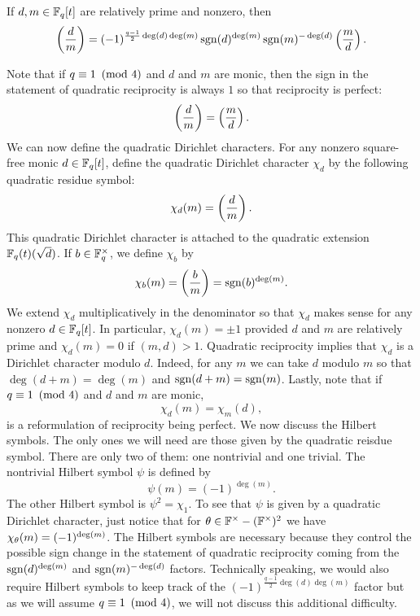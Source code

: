         \begin{theorem}
            If $d,m \in \mathbb{F}_{q}[t]$ are relatively prime and nonzero, then
            \[
                \left(\frac{d}{m}\right) = (-1)^{\frac{q-1}{2}\deg(d)\deg(m)}\operatorname{\mathrm{sgn}}(d)^{\deg(m)}\operatorname{\mathrm{sgn}}(m)^{-\deg(d)}\left(\frac{m}{d}\right).
            \]
        \end{theorem}

        Note that if $q \equiv 1 \ \left(\text{mod }4\right)$ and $d$ and $m$ are monic, then the sign in the statement of quadratic reciprocity is always $1$ so that reciprocity is perfect:
        \[
            \left(\frac{d}{m}\right) = \left(\frac{m}{d}\right).
        \]
        We can now define the quadratic Dirichlet characters. For any nonzero square-free monic $d \in \mathbb{F}_{q}[t]$, define the quadratic Dirichlet character $\chi_{d}$ by the following quadratic residue symbol:
        \[
            \chi_{d}(m) = \left(\frac{d}{m}\right).
        \]
        This quadratic Dirichlet character is attached to the quadratic extension $\mathbb{F}_{q}(t)(\sqrt{d})$. If $b \in \mathbb{F}_{q}^{\times}$, we define $\chi_{b}$ by
        \[
            \chi_{b}(m) = \left(\frac{b}{m}\right) = \operatorname{\mathrm{sgn}}(b)^{\deg(m)}.
        \]
        We extend $\chi_{d}$ multiplicatively in the denominator so that $\chi_{d}$ makes sense for any nonzero $d \in \mathbb{F}_{q}[t]$. In particular, $\chi_{d}(m) = \pm1$ provided $d$ and $m$ are relatively prime and $\chi_{d}(m) = 0$ if $(m,d) > 1$. Quadratic reciprocity implies that $\chi_{d}$ is a Dirichlet character modulo $d$. Indeed, for any $m$ we can take $d$ modulo $m$ so that $\deg(d+m) = \deg(m)$ and $\operatorname{\mathrm{sgn}}(d+m) = \operatorname{\mathrm{sgn}}(m)$. Lastly, note that if $q \equiv 1 \ \left(\text{mod }4\right)$ and $d$ and $m$ are monic,
        \[
            \chi_{d}(m) = \chi_{m}(d),
        \]
        is a reformulation of reciprocity being perfect. We now discuss the Hilbert symbols. The only ones we will need are those given by the quadratic reisdue symbol. There are only two of them: one nontrivial and one trivial. The nontrivial Hilbert symbol $\psi$ is defined by
        \[
            \psi(m) = (-1)^{\deg(m)}.
        \]
        The other Hilbert symbol is $\psi^{2} = \chi_{1}$. To see that $\psi$ is given by a quadratic Dirichlet character, just notice that for $\theta \in \mathbb{F}^{\times}-(\mathbb{F}^{\times})^{2}$ we have $\chi_{\theta}(m) = (-1)^{\deg(m)}$. The Hilbert symbols are necessary because they control the possible sign change in the statement of quadratic reciprocity coming from the $\operatorname{\mathrm{sgn}}(d)^{\deg(m)}$ and $\operatorname{\mathrm{sgn}}(m)^{-\deg(d)}$ factors. Technically speaking, we would also require Hilbert symbols to keep track of the $(-1)^{\frac{q-1}{2}\deg(d)\deg(m)}$ factor but as we will assume $q \equiv 1 \ \left(\text{mod }4\right)$, we will not discuss this additional difficulty.

